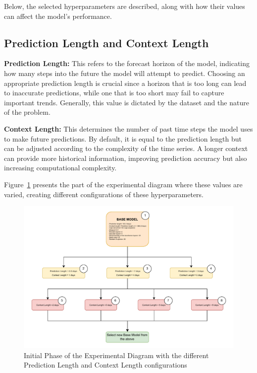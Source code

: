 Below, the selected hyperparameters are described, along with how their values can affect the model's performance.


\subsection{Prediction Length and Context Length}

\textbf{Prediction Length:} This refers to the forecast horizon of the model, indicating how many steps into the future the model will attempt to predict. Choosing an appropriate prediction length is crucial since a horizon that is too long can lead to inaccurate predictions, while one that is too short may fail to capture important trends. Generally, this value is dictated by the dataset and the nature of the problem.

\vspace{10pt}

\noindent\textbf{Context Length:} This determines the number of past time steps the model uses to make future predictions. By default, it is equal to the prediction length but can be adjusted according to the complexity of the time series. A longer context can provide more historical information, improving prediction accuracy but also increasing computational complexity.

Figure~\ref{D1} presents the part of the experimental diagram where these values are varied, creating different configurations of these hyperparameters.

\begin{figure}[htbp]
    \centering
    \includegraphics[width=15 cm]{5_ChapterDesign/figuras/Diagrams/D1.pdf}
    \caption{Initial Phase of the Experimental Diagram with the different Prediction Length and Context Length configurations}
    \label{D1}
\end{figure}



